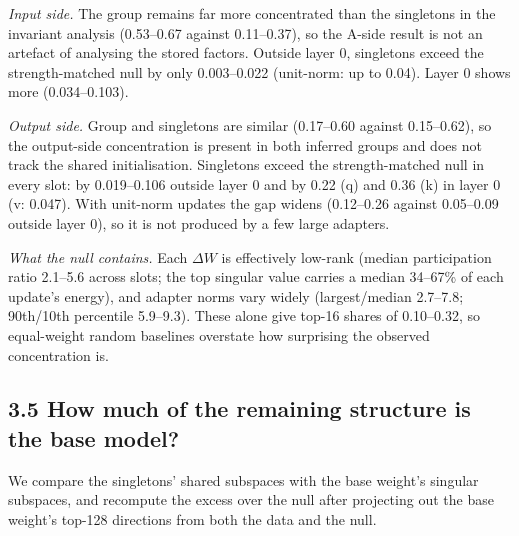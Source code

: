 \documentclass[
  11pt,
]{article}
\begin{document}
\emph{Input side.} The group remains far more concentrated than the
singletons in the invariant analysis (0.53--0.67 against 0.11--0.37), so
the A-side result is not an artefact of analysing the stored factors.
Outside layer 0, singletons exceed the strength-matched null by only
0.003--0.022 (unit-norm: up to 0.04). Layer 0 shows more (0.034--0.103).

\emph{Output side.} Group and singletons are similar (0.17--0.60 against
0.15--0.62), so the output-side concentration is present in both
inferred groups and does not track the shared initialisation. Singletons
exceed the strength-matched null in every slot: by 0.019--0.106 outside
layer 0 and by 0.22 (q) and 0.36 (k) in layer 0 (v: 0.047). With
unit-norm updates the gap widens (0.12--0.26 against 0.05--0.09 outside
layer 0), so it is not produced by a few large adapters.

\emph{What the null contains.} Each \(\Delta W\) is effectively low-rank
(median participation ratio 2.1--5.6 across slots; the top singular
value carries a median 34--67\% of each update's energy), and adapter
norms vary widely (largest/median 2.7--7.8; 90th/10th percentile
5.9--9.3). These alone give top-16 shares of 0.10--0.32, so equal-weight
random baselines overstate how surprising the observed concentration is.

\subsection{3.5 How much of the remaining structure is the base
model?}\label{how-much-of-the-remaining-structure-is-the-base-model}

We compare the singletons' shared subspaces with the base weight's
singular subspaces, and recompute the excess over the null after
projecting out the base weight's top-128 directions from both the data
and the null.
\end{document}
